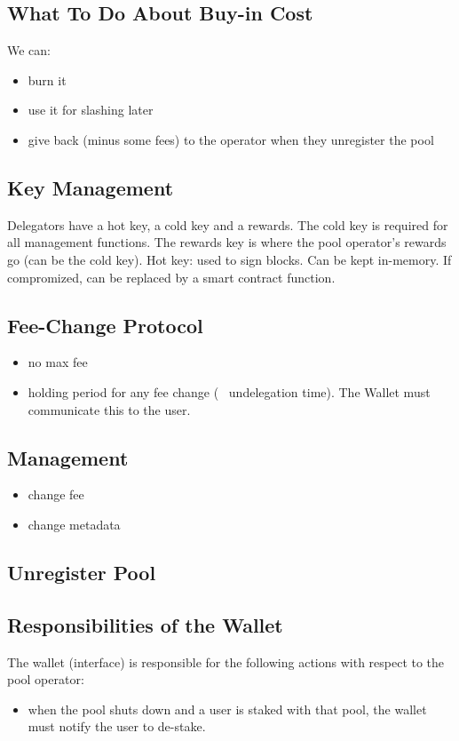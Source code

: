\subsection{What To Do About Buy-in Cost}
We can: 
\begin{itemize}
    \item burn it
    \item use it for slashing later
    \item give back (minus some fees) to the operator when they unregister the pool
\end{itemize}

\subsection{Key Management}
Delegators have a hot key, a cold key and a rewards. The cold key is required for all management functions. The rewards key is where the pool operator's rewards go (can be the cold key). Hot key: used to sign blocks. Can be kept in-memory. If compromized, can be replaced by a smart contract function. 

\subsection{Fee-Change Protocol}
\begin{itemize}
    \item no max fee 
    \item holding period for any fee change (~ undelegation time). The Wallet must communicate this to the user. 
\end{itemize}

\subsection{Management}
\begin{itemize}
    \item change fee
    \item change metadata
\end{itemize}

\subsection{Unregister Pool}


\subsection{Responsibilities of the Wallet}
The wallet (interface) is responsible for the following actions with respect to the pool operator:
\begin{itemize}
    \item when the pool shuts down and a user is staked with that pool, the wallet must notify the user to de-stake. 
\end{itemize}

